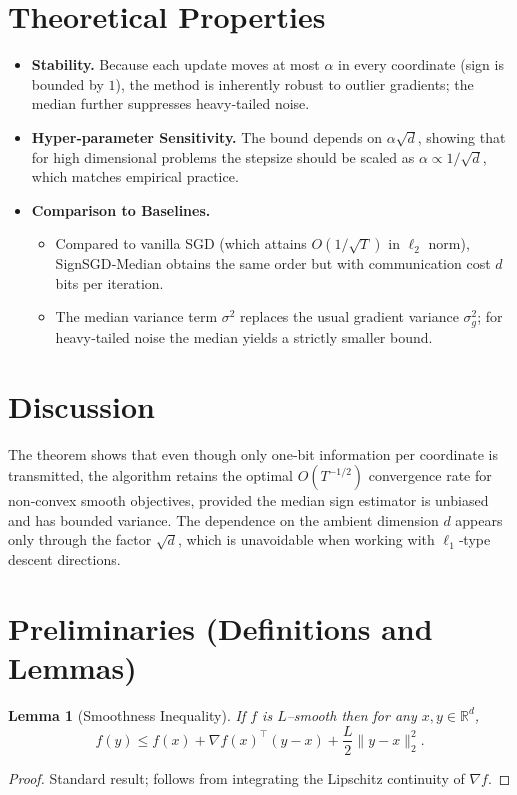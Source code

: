\documentclass{article}
\newtheorem{lemma}{Lemma}
\newcommand{\R}{\mathbb{R}}
\begin{document}
\section*{Theoretical Properties}
\begin{itemize}[leftmargin=*]
\item \textbf{Stability.} Because each update moves at most $\alpha$ in every coordinate (sign is bounded by $1$), the method is inherently robust to outlier gradients; the median further suppresses heavy‑tailed noise.
\item \textbf{Hyper‑parameter Sensitivity.} The bound depends on $\alpha\sqrt{d}$, showing that for high dimensional problems the stepsize should be scaled as $\alpha\propto 1/\sqrt{d}$, which matches empirical practice.
\item \textbf{Comparison to Baselines.}
    \begin{itemize}
        \item Compared to vanilla SGD (which attains $O(1/\sqrt{T})$ in $\ell_{2}$ norm), SignSGD‑Median obtains the same order but with communication cost $d$ bits per iteration.
        \item The median variance term $\sigma^{2}$ replaces the usual gradient variance $\sigma_{g}^{2}$; for heavy‑tailed noise the median yields a strictly smaller bound.
    \end{itemize}
\end{itemize}

\section*{Discussion}
The theorem shows that even though only one‑bit information per coordinate is transmitted, the algorithm retains the optimal $O(T^{-1/2})$ convergence rate for non‑convex smooth objectives, provided the median sign estimator is unbiased and has bounded variance. The dependence on the ambient dimension $d$ appears only through the factor $\sqrt{d}$, which is unavoidable when working with $\ell_{1}$‑type descent directions.

\newpage
\section*{Preliminaries (Definitions and Lemmas)}
\begin{lemma}[Smoothness Inequality]\label{lem:smooth}
If $f$ is $L$–smooth then for any $x,y\in\R^{d}$,
\[
f(y)\le f(x)+\nabla f(x)^{\top}(y-x)+\frac{L}{2}\|y-x\|_{2}^{2}.
\]
\end{lemma}
\begin{proof}
Standard result; follows from integrating the Lipschitz continuity of $\nabla f$. \qedhere
\end{proof}
\end{document}
